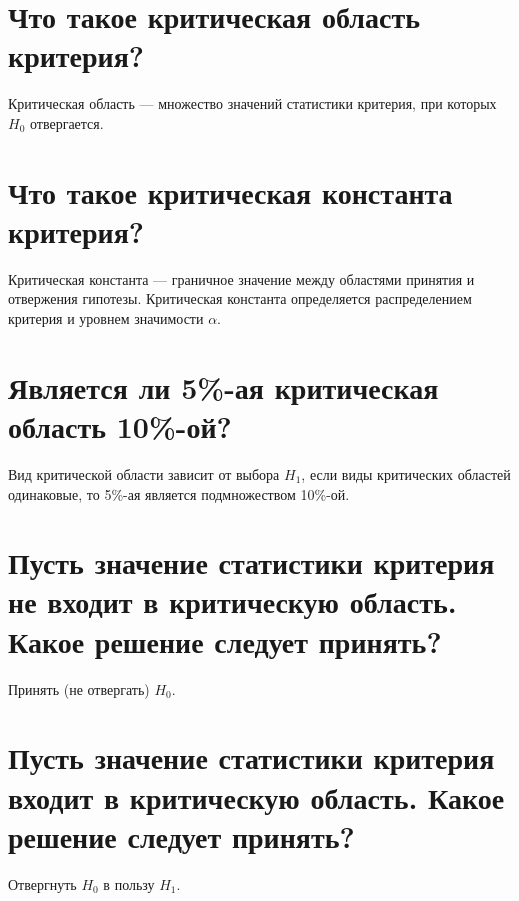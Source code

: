 \documentclass{article}
\begin{document}

\section{Что такое критическая область критерия?}

Критическая область --- множество значений статистики критерия, при которых $H_0$ отвергается.


\section{Что такое критическая константа критерия?}

Критическая константа --- граничное значение между областями принятия и отвержения гипотезы. Критическая константа определяется распределением критерия и уровнем значимости $\alpha$.


\section{Является ли 5\%-ая критическая область 10\%-ой?}

Вид критической области зависит от выбора $H_1$, если виды критических областей одинаковые, то 5\%-ая является подмножеством 10\%-ой.


\section{Пусть значение статистики критерия не входит в критическую область. Какое решение следует принять?}

Принять (не отвергать) $H_0$.


\section{Пусть значение статистики критерия входит в критическую область. Какое решение следует принять?}

Отвергнуть $H_0$ в пользу $H_1$.
\end{document}
